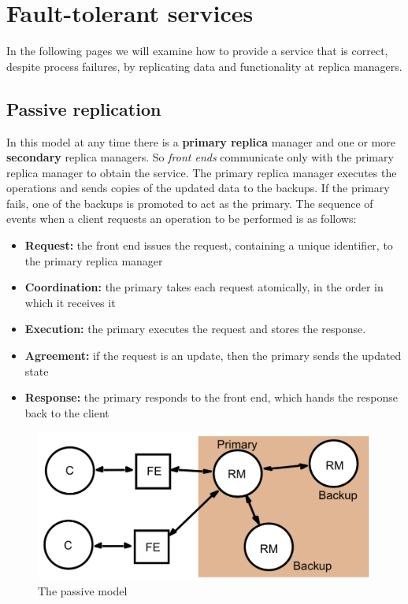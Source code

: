 \section{Fault-tolerant services}
In the following pages we will examine how to provide a service that is correct, despite process failures, by replicating data and functionality at replica managers.

\subsection{Passive replication}
In this model at any time there is a \textbf{primary replica} manager and one or more \textbf{secondary} replica managers. So \textit{front ends} communicate only with the primary replica manager to obtain the service. The primary replica manager executes the operations and sends copies of the updated data to the backups. If the primary fails, one of the backups is promoted to act as the primary. The sequence of events when a client requests an operation to be performed is as follows:
\begin{itemize}
    \item \textbf{Request:} the front end issues the request, containing a unique identifier, to the primary replica manager
    \item \textbf{Coordination:} the primary takes each request atomically, in the order in which it receives it
    \item \textbf{Execution:} the primary executes the request and stores the response.
    \item \textbf{Agreement:} if the request is an update, then the primary sends the updated state
    \item \textbf{Response:} the primary responds to the front end, which hands the response back to the client
\end{itemize}

\begin{figure}[!h]
    \centering
    \includegraphics[width=.70\linewidth]{images/roleGroupCommunication/PassiveModel.png}
    \caption{The passive model}
\end{figure}
\newpage

